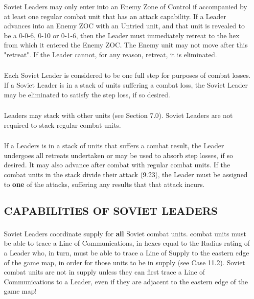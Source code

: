 \subsubsection{} Soviet Leaders may only enter into an Enemy Zone of Control if accompanied by at least one regular combat unit that has an attack capability. If a Leader advances into an Enemy ZOC with an Untried unit, and that unit is revealed to be a 0-0-6, 0-10 or 0-1-6, then the Leader must immediately retreat to the hex from which it entered the Enemy ZOC. The Enemy unit may not move after this "retreat". If the Leader cannot, for any reason, retreat, it is eliminated.

\subsubsection{} Each Soviet Leader is considered to be one full step for purposes of combat losses. If a Soviet Leader is in a stack of units suffering a combat loss, the Soviet Leader may be eliminated to satisfy the step loss, if so desired.

\subsubsection{} Leaders may stack with other units (see Section 7.0). Soviet Leaders are not required to stack regular combat units.

\subsubsection{} If a Leaders is in a stack of units that suffers a combat result, the Leader undergoes all retreats undertaken or may be used to absorb step losses, if so desired. It may also advance after combat with regular combat units. If the combat units in the stack divide their attack (9.23), the Leader must be assigned to \textbf{one} of the attacks, suffering any results that that attack incurs.

\begin{flushleft}
  \subsection{CAPABILITIES OF SOVIET LEADERS}
\end{flushleft}

\subsubsection{} Soviet Leaders coordinate supply for \textbf{all} Soviet combat units. combat units must be able to trace a Line of Communications, in hexes equal to the Radius rating of a Leader who, in turn, must be able to trace a Line of Supply to the eastern edge of the game map, in order for those units to be in supply (see Case 11.2). Soviet combat units are not in supply unless they can first trace a Line of Communications to a Leader, even if they are adjacent to the eastern edge of the game map!

